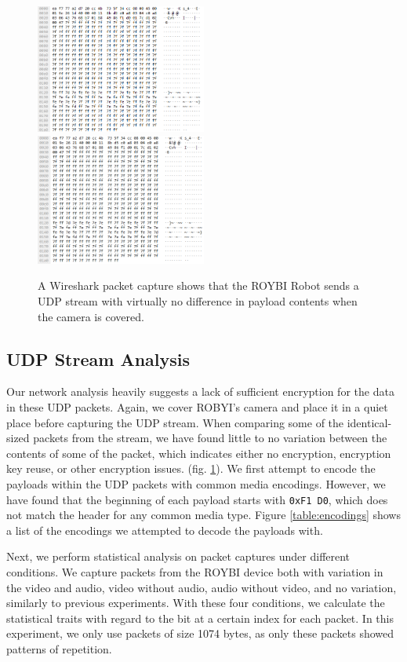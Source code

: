 \documentclass[12pt]{ucthesis}
\begin{document}
\begin{figure}
    \includegraphics[width=0.5\textwidth]{unencrypted1.png}
    \includegraphics[width=0.5\textwidth]{unencrypted2.png}
    \caption{A Wireshark packet capture shows that the ROYBI Robot sends a UDP stream with virtually no difference in payload contents when the camera is covered.}
    \label{fig:unencrypted}
\end{figure}


\subsection{UDP Stream Analysis}
Our network analysis heavily suggests a lack of sufficient encryption for the data in these UDP packets. Again, we cover ROBYI's camera and place it in a quiet place before capturing the UDP stream. When comparing some of the identical-sized packets from the stream, we have found little to no variation between the contents of some of the packet, which indicates either no encryption, encryption key reuse, or other encryption issues. (fig. \ref{fig:unencrypted}). We first attempt to encode the payloads within the UDP packets with common media encodings. However, we have found that the beginning of each payload starts with \texttt{0xF1 D0}, which does not match the header for any common media type. Figure \ref{table:encodings} shows a list of the encodings we attempted to decode the payloads with.

Next, we perform statistical analysis on packet captures under different conditions. We capture packets from the ROYBI device both with variation in the video and audio, video without audio, audio without video, and no variation, similarly to previous experiments. With these four conditions, we calculate the statistical traits with regard to the bit at a certain index for each packet. In this experiment, we only use packets of size 1074 bytes, as only these packets showed patterns of repetition.
\end{document}
